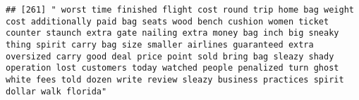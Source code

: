 \documentclass[
]{article}
\begin{document}
\begin{verbatim}
## [261] " worst time finished flight cost round trip home bag weight cost additionally paid bag seats wood bench cushion women ticket counter staunch extra gate nailing extra money bag inch big sneaky thing spirit carry bag size smaller airlines guaranteed extra oversized carry good deal price point sold bring bag sleazy shady operation lost customers today watched people penalized turn ghost white fees told dozen write review sleazy business practices spirit dollar walk florida"                                                                                                                                                                                                                                                                                                                                                                                                                                                                                                                                                                                                                                                                                                                                                                                                                                                                                                                                                                                                                                                                                                                                                                                                                                                                                                    

\end{verbatim}
\end{document}
